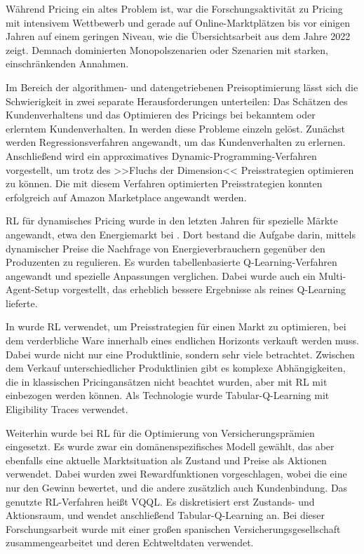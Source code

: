 Während Pricing ein altes Problem ist, war die Forschungsaktivität zu Pricing mit intensivem Wettbewerb und gerade auf Online-Marktplätzen bis vor einigen Jahren auf einem geringen Niveau, wie die Übersichtsarbeit \cite{Gerpott2022} aus dem Jahre 2022 zeigt.
Demnach dominierten Monopolszenarien oder Szenarien mit starken, einschränkenden Annahmen.

Im Bereich der algorithmen- und datengetriebenen Preisoptimierung lässt sich die Schwierigkeit in zwei separate Herausforderungen unterteilen: Das Schätzen des Kundenverhaltens und das Optimieren des Pricings bei bekanntem oder erlerntem Kundenverhalten.
In \cite{10.1145/3219819.3219833} werden diese Probleme einzeln gelöst.
Zunächst werden Regressionsverfahren angewandt, um das Kundenverhalten zu erlernen.
Anschließend wird ein approximatives Dynamic-Programming-Verfahren vorgestellt, um trotz des >>Fluchs der Dimension<< Preisstrategien optimieren zu können.
Die mit diesem Verfahren optimierten Preisstrategien konnten erfolgreich auf Amazon Marketplace angewandt werden.

RL für dynamisches Pricing wurde in den letzten Jahren für spezielle Märkte angewandt, etwa den Energiemarkt bei \cite{Kim2016DynamicPA}.
Dort bestand die Aufgabe darin, mittels dynamischer Preise die Nachfrage von Energieverbrauchern gegenüber den Produzenten zu regulieren.
Es wurden tabellenbasierte Q-Learning-Verfahren angewandt und spezielle Anpassungen verglichen.
Dabei wurde auch ein Multi-Agent-Setup vorgestellt, das erheblich bessere Ergebnisse als reines Q-Learning lieferte.

In \cite{RANA2015426} wurde RL verwendet, um Preisstrategien für einen Markt zu optimieren, bei dem verderbliche Ware innerhalb eines endlichen Horizonts verkauft werden muss.
Dabei wurde nicht nur eine Produktlinie, sondern sehr viele betrachtet.
Zwischen dem Verkauf unterschiedlicher Produktlinien gibt es komplexe Abhängigkeiten, die in klassischen Pricingansätzen nicht beachtet wurden, aber mit RL mit einbezogen werden können.
Als Technologie wurde Tabular-Q-Learning mit Eligibility Traces verwendet.

Weiterhin wurde bei \cite{KRASHENINNIKOVA20198} RL für die Optimierung von Versicherungsprämien eingesetzt.
Es wurde zwar ein domänenspezifisches Modell gewählt, das aber ebenfalls eine aktuelle Marktsituation als Zustand und Preise als Aktionen verwendet.
Dabei wurden zwei Rewardfunktionen vorgeschlagen, wobei die eine nur den Gewinn bewertet, und die andere zusätzlich auch Kundenbindung.
Das genutzte RL-Verfahren heißt VQQL.
Es diskretisiert erst Zustands- und Aktionsraum, und wendet anschließend Tabular-Q-Learning an.
Bei dieser Forschungsarbeit wurde mit einer großen spanischen Versicherungsgesellschaft zusammengearbeitet und deren Echtweltdaten verwendet.

